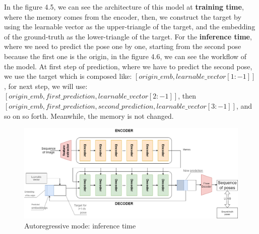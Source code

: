 In the figure 4.5, we can see the architecture of this model at \textbf{training time}, where the memory comes from the encoder, then, we construct the target by using the learnable vector as the upper-triangle of the target, and the embedding of the ground-truth as the lower-triangle of the target.
For the \textbf{inference time}, where we need to predict the pose one by one, starting from the second pose because the first one is the origin, in the figure 4.6, we can see the workflow of the model.
At first step of prediction, where we have to predict the second pose, we use the target which is composed like: $[origin\_emb, learnable\_vector[1\colon-1]]$ , for next step,
we will use: $[origin\_emb, first\_prediction, learnable\_vector[2\colon-1]]$, then $[origin\_emb, first\_prediction, second\_prediction, learnable\_vector[3\colon-1]]$, and so on so forth.
Meanwhile, the memory is not changed.

\begin{figure}[H]
    \centering
    \includegraphics[width=\textwidth]{images/4_1_ar_inference}
    \caption{Autoregressive mode: inference time}\label{fig:figure-auto-regressive-inference}
\end{figure}
